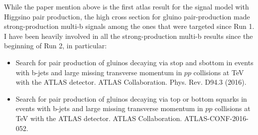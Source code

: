 While the paper mention above is the first \gls{atlas} result for the signal model with Higgsino pair production, 
the high cross section for gluino pair-production made strong-production multi-b signals among the ones that were targeted since Run 1. 
I have been heavily involved in all the strong-production multi-b results since the beginning of Run 2, in particular:

\begin{itemize}
\item Search for pair production of gluinos decaying via stop and sbottom in events with b-jets and large missing transverse momentum in $pp$ collisions at \cmtre TeV with the ATLAS detector. ATLAS Collaboration. Phys. Rev. D94.3 (2016).
\item Search for pair production of gluinos decaying via top or bottom squarks in events with b-jets and large missing transverse momentum in
$pp$ collisions at \cmtre TeV with the ATLAS detector. ATLAS Collaboration. ATLAS-CONF-2016-052.
\end{itemize}




